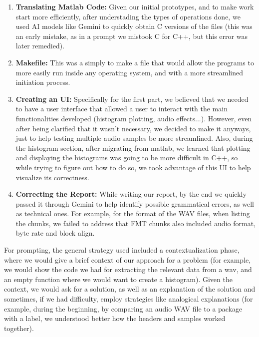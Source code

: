 \begin{enumerate}

    \item \textbf{Translating Matlab Code:} Given our initial prototypes, and to make work start more efficiently, after understading the types of operations done, we used AI models like Gemini to quickly obtain C versions of the files (this was an early mistake, as in a prompt we mistook C for C++, but this error was later remedied).
    
    \item \textbf{Makefile:} This was a simply to make a file that would allow the programs to more easily run inside any operating system, and with a more streamlined initiation process.
    
    \item \textbf{Creating an UI:} Specifically for the first part, we believed that we needed to have a user interface that allowed a user to interact with the main functionalities developed (histogram plotting, audio effects...). However, even after being clarified that it wasn't necessary, we decided to make it anyways, just to help testing multiple audio samples be more streamlined. Also, during the histogram section, after migrating from matlab, we learned that plotting and displaying the histograms was going to be more difficult in C++, so while trying to figure out how to do so, we took advantage of this UI to help visualize its correctness.
    
    \item \textbf{Correcting the Report:} While writing our report, by the end we quickly passed it through Gemini to help identify possible grammatical errors, as well as technical ones. For example, for the format of the WAV files, when listing the chunks, we failed to address that FMT chunks also included audio format, byte rate and block align.

\end{enumerate}

For prompting, the general strategy used included a contextualization phase, where we would give a brief context of our approach for a problem (for example, we would show the code we had for extracting the relevant data from a wav, and an empty function where we would want to create a histogram). Given the context, we would ask for a solution, as well as an explanation of the solution and sometimes, if we had difficulty, employ strategies like analogical explanations (for example, during the beginning, by comparing an audio WAV file to a package with a label, we understood better how the headers and samples worked together).